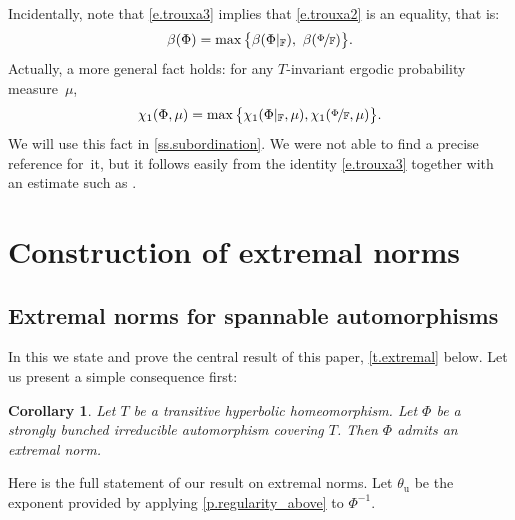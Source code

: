 \documentclass[JEP,XML,SOM,Unicode]{cedram}
\theoremstyle{plain}
\newtheorem{corollary}[theorem]{Corollary}
\theoremstyle{definition}
\newcommand{\FF}{\mathbb{F}}
\newcommand{\uu}{\mathrm{u}}
\begin{document}
Incidentally, note that \eqref{e.trouxa3} implies that \eqref{e.trouxa2} is an equality, that is:
\begin{equation}\label{e.split_beta}
\beta(\Phi) = \max \big\{ \beta(\Phi|_\FF), \ \beta(\nicefrac{\Phi}{\FF}) \big\}.
\end{equation}
Actually, a more general fact holds: for any $T$-invariant ergodic probability measure~$\mu$,%
\begin{equation}\label{e.split_chi}
\chi_1(\Phi, \mu) = \max \big\{ \chi_1(\Phi|_{\FF}, \mu), \chi_1(\nicefrac{\Phi}{\FF}, \mu) \big\}.
\end{equation}
We will use this fact in \cref{ss.subordination}.
We were not able to find a precise reference for~it, but it follows easily from the identity \eqref{e.trouxa3} together with an estimate such as \hbox{\cite[Lem.\,12]{B_Oseledets}}.

\section{Construction of extremal norms}\label{s.norms}

\subsection{Extremal norms for spannable automorphisms}\label{ss.extremal_norms}

In this  we state and prove the central result of this paper, \cref{t.extremal} below.
Let us present a simple consequence first:

\begin{corollary}\label{c.extremal}
Let $T$ be a transitive hyperbolic homeomorphism.
Let $\Phi$ be a strongly bunched irreducible automorphism covering $T$.
Then $\Phi$ admits an extremal norm.
\end{corollary}

Here is the full statement of our result on extremal norms.
Let $\theta_\uu$ be the exponent provided by applying \cref{p.regularity_above} to $\Phi^{-1}$.
\end{document}
